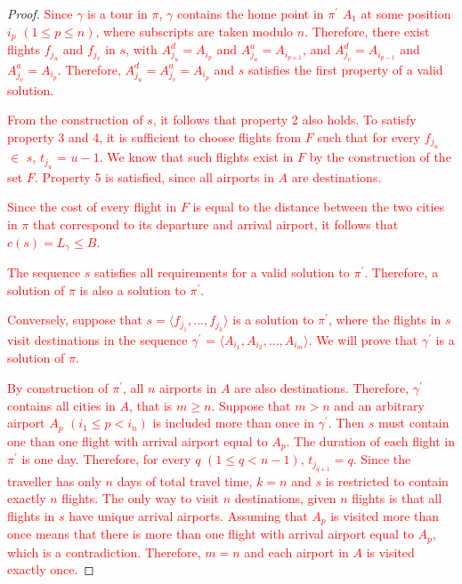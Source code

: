\documentclass{mprop}
\theoremstyle{definition}
\begin{document}
\begin{proof}
\textcolor{red}{
Since $\gamma$ is a tour in $\pi$, $\gamma$ contains the home point in $\pi^{\prime}$ $A_{1}$ at some position $i_{p}$ $(1 \leq p \leq n)$, where subscripts are taken modulo $n$. Therefore, there exist flights $f_{j_{u}}$ and $f_{j_{v}}$ in $s$, with $A^{d}_{j_{u}} = A_{i_{p}}$ and $A^{a}_{j_{u}} = A_{i_{p+1}}$, and $A^{d}_{j_{v}} = A_{i_{p-1}}$ and $A^{a}_{j_{v}} = A_{i_{p}}$. Therefore, $A^{d}_{j_{u}} = A^{a}_{j_{v}} = A_{i_{p}}$ and $s$ satisfies the first property of a valid solution.}

\textcolor{red}{
From the construction of $s$, it follows that property 2 also holds. To satisfy property 3 and 4, it is sufficient to choose flights from $F$ such that for every $f_{j_{u}}$ $\in$ $s$, $t_{j_{u}}$ = $u-1$. We know that such flights exist in $F$ by the construction of the set $F$. Property 5 is satisfied, since all airports in $A$ are destinations.}

\textcolor{red}{
Since the cost of every flight in $F$ is equal to the distance between the two cities in $\pi$ that correspond to its departure and arrival airport, it follows that $c(s) = L_{\gamma} \leq B$.}

\textcolor{red}{
The sequence $s$ satisfies all requirements for a valid solution to $\pi^{\prime}$. Therefore, a solution of $\pi$ is also a solution to $\pi^{\prime}$.}

\textcolor{red}{
Conversely, suppose that $s = \langle f_{j_{1}},...,f_{j_{k}} \rangle $ is a solution to $\pi^{\prime}$, where the flights in $s$ visit destinations in the sequence $\gamma^{\prime}$ = $\langle A_{i_{1}}, A_{i_{2}},...,A_{i_{m}} \rangle$. We will prove that $\gamma^{\prime}$ is a solution of $\pi$.}

\textcolor{red}{
By construction of $\pi^{\prime}$, all $n$ airports in $A$ are also destinations. Therefore, $\gamma^{\prime}$ contains all cities in $A$, that is $m \geq n$. Suppose that $m > n$ and an arbitrary airport $A_{p}$ $(i_{1} \leq p < i_{n})$ is included more than once in $\gamma^{\prime}$. Then $s$ must contain one than one flight with arrival airport equal to $A_{p}$. 
The duration of each flight in $\pi^{\prime}$ is one day. Therefore, for every $q$ $(1 \leq q < n - 1)$, $t_{j_{q+1}} = q$. Since the traveller has only $n$ days of total travel time, $k = n$ and $s$ is restricted to contain exactly $n$ flights. The only way to visit $n$ destinations, given $n$ flights is that all flights in $s$ have unique arrival airports. Assuming that $A_{p}$ is visited more than once means that there is more than one flight with arrival airport equal to $A_{p}$, which is a contradiction. Therefore, $m = n$ and each airport in $A$ is visited exactly once.}


\end{proof}
\end{document}
